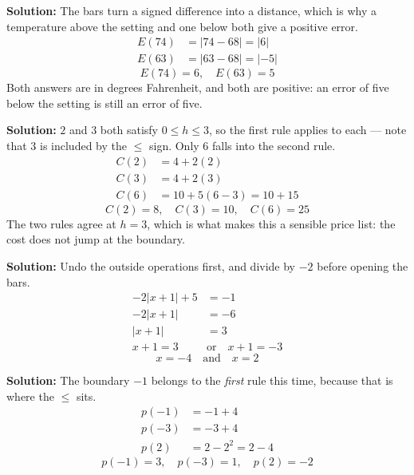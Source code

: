 \documentclass[12pt]{article}
\begin{document}

\textbf{Solution:} The bars turn a signed difference into a distance, which is why a temperature above the setting and one below both give a positive error.
\begin{align*}
  E(74) &= |74 - 68| = |6| \\
  E(63) &= |63 - 68| = |{-5}|
\end{align*}
\[ \boxed{E(74) = 6, \quad E(63) = 5} \]
Both answers are in degrees Fahrenheit, and both are positive: an error of five below the setting is still an error of five.


\textbf{Solution:} $2$ and $3$ both satisfy $0 \le h \le 3$, so the first rule applies to each --- note that $3$ is included by the $\le$ sign. Only $6$ falls into the second rule.
\begin{align*}
  C(2) &= 4 + 2(2) \\
  C(3) &= 4 + 2(3) \\
  C(6) &= 10 + 5(6-3) = 10 + 15
\end{align*}
\[ \boxed{C(2) = 8, \quad C(3) = 10, \quad C(6) = 25} \]
The two rules agree at $h = 3$, which is what makes this a sensible price list: the cost does not jump at the boundary.


\textbf{Solution:} Undo the outside operations first, and divide by $-2$ before opening the bars.
\begin{align*}
  -2|x+1| + 5 &= -1 \\
  -2|x+1| &= -6 \\
  |x+1| &= 3 \\
  x + 1 = 3 \quad &\text{or} \quad x + 1 = -3
\end{align*}
\[ \boxed{x = -4 \quad \text{and} \quad x = 2} \]


\textbf{Solution:} The boundary $-1$ belongs to the \emph{first} rule this time, because that is where the $\le$ sits.
\begin{align*}
  p(-1) &= -1 + 4 \\
  p(-3) &= -3 + 4 \\
  p(2) &= 2 - 2^2 = 2 - 4
\end{align*}
\[ \boxed{p(-1) = 3, \quad p(-3) = 1, \quad p(2) = -2} \]
\end{document}
